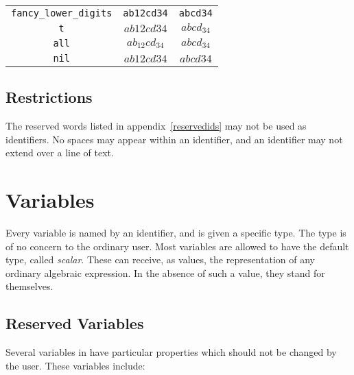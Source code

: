 \begin{tabular}{ccc}
\texttt{fancy\_lower\_digits} & \texttt{ab12cd34} & \texttt{abcd34} \\
\texttt{t} & \(ab12cd34\) & \(abcd_{34}\) \\
\texttt{all} & \(ab_{12}cd_{34}\) & \(abcd_{34}\) \\
\texttt{nil} & \(ab12cd34\) & \(abcd34\)
\end{tabular}

\subsection*{Restrictions}

The reserved words listed in appendix~\ref{reservedids} may not be used as
identifiers.  No spaces may appear within an identifier, and an identifier
may not extend over a line of text.


\section{Variables}

Every variable is named by an identifier, and is given a
specific type.  The type is of no concern to the ordinary user.  Most
variables are allowed to have the default type, called
\emph{scalar}.
These can receive, as values, the representation of any ordinary algebraic
expression.  In the absence of such a value, they stand for themselves.

\subsection*{Reserved Variables}
\hypertarget{reserved:E}{}
\hypertarget{reserved:I}{}
\hypertarget{reserved:INFINITY}{}
\hypertarget{reserved:NIL}{}
\hypertarget{reserved:PI}{}
\hypertarget{reserved:T}{}
\hypertarget{reserved:K!*}{}
\hypertarget{reserved:EULER_GAMMA}{}
\hypertarget{reserved:GOLDEN_RATIO}{}
\hypertarget{reserved:CATALAN}{}
\hypertarget{reserved:KHINCHIN}{}
\hypertarget{reserved:NEGATIVE}{}
\hypertarget{reserved:POSITIVE}{}

Several variables in {\REDUCE} have particular
properties which should not be changed by the user.  These variables
include:

